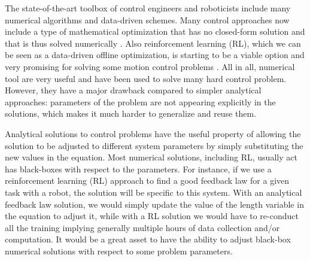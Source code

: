 


The state-of-the-art toolbox of control engineers and roboticists include many numerical algorithms and data-driven schemes. Many control approaches now include a type of mathematical optimization that has no closed-form solution and that is thus solved numerically \cite{kuindersma_optimization-based_2016}. Also reinforcement learning (RL), which we can be seen as a data-driven offline optimization, is starting to be a viable option and very promising for solving some motion control problems \cite{rudin_learning_2022}. All in all, numerical tool are very useful and have been used to solve many hard control problem. However, they have a major drawback compared to simpler analytical approaches: parameters of the problem are not appearing explicitly in the solutions, which makes it much harder to generalize and reuse them. 

Analytical solutions to control problems have the useful property of allowing the solution to be adjusted to different system parameters by simply substituting the new values in the equation. Most numerical solutions, including RL, usually act has black-boxes with respect to the parameters. For instance, if we use a reinforcement learning (RL) approach to find a good feedback law for a given task with a robot, the solution will be specific to this system. %
With an analytical feedback law solution, we would simply update the value of the length variable in the equation to adjust it, while with a RL solution we would have to re-conduct all the training implying generally multiple hours of data collection and/or computation. It would be a great asset to have the ability to adjust black-box numerical solutions with respect to some problem parameters.  

